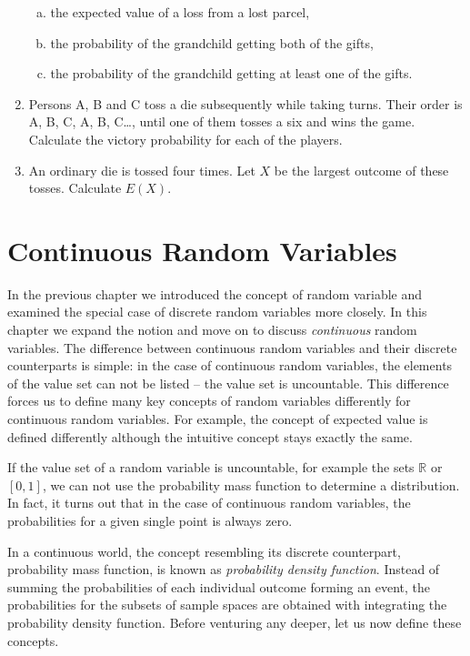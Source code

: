 \documentclass[12pt,a4paper,leqno]{report}
\newcommand{\R}{\mathbb{R}}
\theoremstyle{plain}
\theoremstyle{definition}
\begin{document}
\begin{enumerate}
\begin{enumerate}[(a)]
\item the expected value of a loss from a lost parcel,
\item the probability of the grandchild getting both of the gifts,
\item the probability of the grandchild getting at least one of the gifts.
\end{enumerate}
\item Persons A, B and C toss a die subsequently while taking turns. Their order is A, B, C, A, B, C\ldots, until one of them tosses a six and wins the game. Calculate the victory probability for each of the players.
\item An ordinary die is tossed four times. Let $X$ be the largest outcome of these tosses. Calculate $E(X)$.
\end{enumerate}


\chapter{Continuous Random Variables}\label{cont_rv}

In the previous chapter we introduced the concept of random variable and examined the special case of discrete random variables more closely. In this chapter we expand the notion and move on to discuss \emph{continuous} random variables. The difference between continuous random variables and their discrete counterparts is simple: in the case of continuous random variables, the elements of the value set can not be listed -- the value set is uncountable. This difference forces us to define many key concepts of random variables differently for continuous random variables. For example, the concept of expected value is defined differently although the intuitive concept stays exactly the same.

If the value set of a random variable is uncountable, for example the sets $\R$ or $[0,1]$, we can not use the probability mass function to determine a distribution. In fact, it turns out that in the case of continuous random variables, the probabilities for a given single point is always zero.

In a continuous world, the concept resembling its discrete counterpart, probability mass function, is known as \emph{probability density function}. Instead of summing the probabilities of each individual outcome forming an event, the probabilities for the subsets of sample spaces are obtained with integrating the probability density function. Before venturing any deeper, let us now define these concepts.
\end{document}
